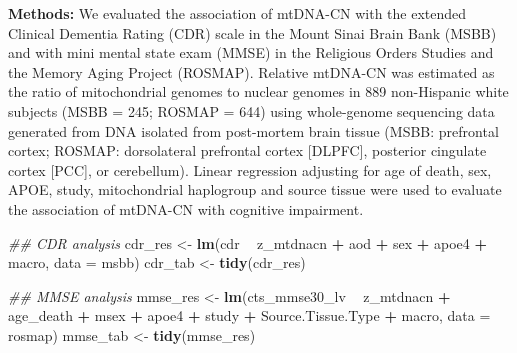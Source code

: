 \documentclass[]{book}
\newenvironment{Shaded}{\begin{snugshade}}{\end{snugshade}}
\newcommand{\CommentTok}[1]{\textcolor[rgb]{0.56,0.35,0.01}{\textit{#1}}}
\newcommand{\DataTypeTok}[1]{\textcolor[rgb]{0.13,0.29,0.53}{#1}}
\newcommand{\KeywordTok}[1]{\textcolor[rgb]{0.13,0.29,0.53}{\textbf{#1}}}
\newcommand{\NormalTok}[1]{#1}
\newcommand{\OperatorTok}[1]{\textcolor[rgb]{0.81,0.36,0.00}{\textbf{#1}}}
\newcommand{\StringTok}[1]{\textcolor[rgb]{0.31,0.60,0.02}{#1}}
\begin{document}
\begin{Shaded}
\end{Shaded}

\textbf{Methods:} We evaluated the association of mtDNA-CN with the extended Clinical Dementia Rating (CDR) scale in the Mount Sinai Brain Bank (MSBB) and with mini mental state exam (MMSE) in the Religious Orders Studies and the Memory Aging Project (ROSMAP). Relative mtDNA-CN was estimated as the ratio of mitochondrial genomes to nuclear genomes in 889 non-Hispanic white subjects (MSBB = 245; ROSMAP = 644) using whole-genome sequencing data generated from DNA isolated from post-mortem brain tissue (MSBB: prefrontal cortex; ROSMAP: dorsolateral prefrontal cortex {[}DLPFC{]}, posterior cingulate cortex {[}PCC{]}, or cerebellum). Linear regression adjusting for age of death, sex, APOE, study, mitochondrial haplogroup and source tissue were used to evaluate the association of mtDNA-CN with cognitive impairment.

\begin{Shaded}
\begin{Highlighting}[]
\CommentTok{## CDR analysis}
\NormalTok{cdr_res <-}\StringTok{ }\KeywordTok{lm}\NormalTok{(cdr }\OperatorTok{~}\StringTok{ }\NormalTok{z_mtdnacn  }\OperatorTok{+}\StringTok{ }\NormalTok{aod }\OperatorTok{+}\StringTok{ }\NormalTok{sex }\OperatorTok{+}\StringTok{ }\NormalTok{apoe4 }\OperatorTok{+}\StringTok{ }\NormalTok{macro, }\DataTypeTok{data =}\NormalTok{ msbb)}
\NormalTok{cdr_tab <-}\StringTok{ }\KeywordTok{tidy}\NormalTok{(cdr_res)}

\CommentTok{## MMSE analysis}
\NormalTok{mmse_res <-}\StringTok{ }\KeywordTok{lm}\NormalTok{(cts_mmse30_lv }\OperatorTok{~}\StringTok{ }\NormalTok{z_mtdnacn  }\OperatorTok{+}\StringTok{ }\NormalTok{age_death }\OperatorTok{+}\StringTok{ }\NormalTok{msex }\OperatorTok{+}\StringTok{ }\NormalTok{apoe4 }\OperatorTok{+}\StringTok{ }\NormalTok{study }\OperatorTok{+}\StringTok{ }\NormalTok{Source.Tissue.Type }\OperatorTok{+}\StringTok{ }\NormalTok{macro, }\DataTypeTok{data =}\NormalTok{ rosmap)}
\NormalTok{mmse_tab <-}\StringTok{ }\KeywordTok{tidy}\NormalTok{(mmse_res)}
\end{Highlighting}
\end{Shaded}
\end{document}
